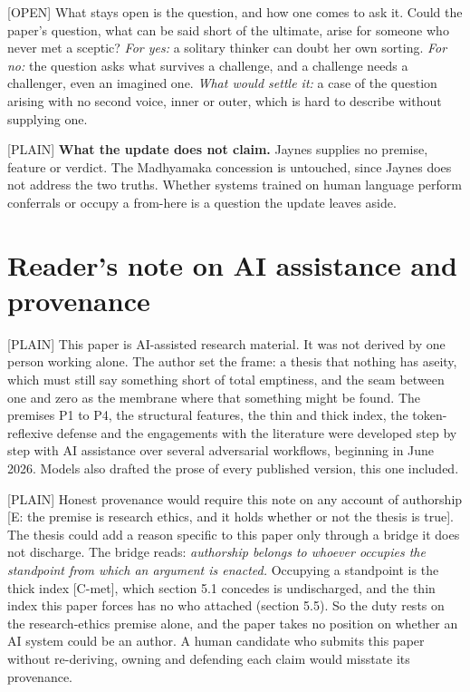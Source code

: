 \documentclass[11pt]{article}
\newcommand{\register}[1]{{\ttfamily\small #1}}
\begin{document}
\register{[OPEN]} What stays open is the question, and how one comes to ask it. Could the paper's question, what can be said short of the ultimate, arise for someone who never met a sceptic? \emph{For yes:} a solitary thinker can doubt her own sorting. \emph{For no:} the question asks what survives a challenge, and a challenge needs a challenger, even an imagined one. \emph{What would settle it:} a case of the question arising with no second voice, inner or outer, which is hard to describe without supplying one.

\register{[PLAIN]} \textbf{What the update does not claim.} Jaynes supplies no premise, feature or verdict. The Madhyamaka concession is untouched, since Jaynes does not address the two truths. Whether systems trained on human language perform conferrals or occupy a from-here is a question the update leaves aside.

\section*{Reader's note on AI assistance and provenance}

\register{[PLAIN]} This paper is AI-assisted research material. It was not derived by one person working alone. The author set the frame: a thesis that nothing has aseity, which must still say something short of total emptiness, and the seam between one and zero as the membrane where that something might be found. The premises P1 to P4, the structural features, the thin and thick index, the token-reflexive defense and the engagements with the literature were developed step by step with AI assistance over several adversarial workflows, beginning in June 2026. Models also drafted the prose of every published version, this one included.

\register{[PLAIN]} Honest provenance would require this note on any account of authorship [E: the premise is research ethics, and it holds whether or not the thesis is true]. The thesis could add a reason specific to this paper only through a bridge it does not discharge. The bridge reads: \emph{authorship belongs to whoever occupies the standpoint from which an argument is enacted.} Occupying a standpoint is the thick index [C-met], which section 5.1 concedes is undischarged, and the thin index this paper forces has no who attached (section 5.5). So the duty rests on the research-ethics premise alone, and the paper takes no position on whether an AI system could be an author. A human candidate who submits this paper without re-deriving, owning and defending each claim would misstate its provenance.
\end{document}
